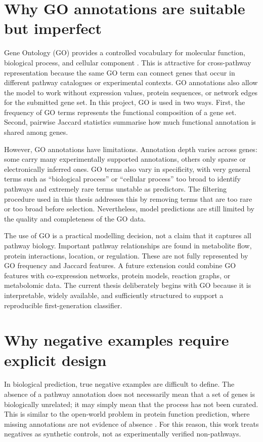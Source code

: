 \documentclass[12pt,letterpaper,oneside,openany]{book}
\begin{document}
\section{Why GO annotations are suitable but imperfect}
\label{sec:bg_go_suitable_imperfect}

Gene Ontology (GO) provides a controlled vocabulary for molecular function, biological process, and cellular component \citep{ashburner2000gene,geneontology2023}. This is attractive for cross-pathway representation because the same GO term can connect genes that occur in different pathway catalogues or experimental contexts. GO annotations also allow the model to work without expression values, protein sequences, or network edges for the submitted gene set. In this project, GO is used in two ways. First, the frequency of GO terms represents the functional composition of a gene set. Second, pairwise Jaccard statistics summarise how much functional annotation is shared among genes.

However, GO annotations have limitations. Annotation depth varies across genes: some carry many experimentally supported annotations, others only sparse or electronically inferred ones. GO terms also vary in specificity, with very general terms such as ``biological process'' or ``cellular process'' too broad to identify pathways and extremely rare terms unstable as predictors. The filtering procedure used in this thesis addresses this by removing terms that are too rare or too broad before selection. Nevertheless, model predictions are still limited by the quality and completeness of the GO data.

The use of GO is a practical modelling decision, not a claim that it captures all pathway biology. Important pathway relationships are found in metabolite flow, protein interactions, location, or regulation. These are not fully represented by GO frequency and Jaccard features. A future extension could combine GO features with co-expression networks, protein models, reaction graphs, or metabolomic data. The current thesis deliberately begins with GO because it is interpretable, widely available, and sufficiently structured to support a reproducible first-generation classifier.

\section{Why negative examples require explicit design}
\label{sec:bg_negative_design}

In biological prediction, true negative examples are difficult to define. The absence of a pathway annotation does not necessarily mean that a set of genes is biologically unrelated; it may simply mean that the process has not been curated. This is similar to the open-world problem in protein function prediction, where missing annotations are not evidence of absence \citep{radivojac2013community}. For this reason, this work treats negatives as synthetic controls, not as experimentally verified non-pathways.
\end{document}
